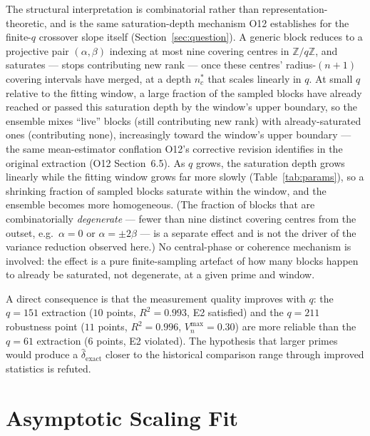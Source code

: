 \documentclass[11pt,a4paper]{article}
\theoremstyle{plain}
\theoremstyle{definition}
\newcommand{\dhat}{\hat\delta_{\mathrm{exact}}}
\begin{document}
  The structural interpretation is combinatorial rather than
  representation-theoretic, and is the same saturation-depth mechanism O12
  establishes for the finite-$q$ crossover slope itself (Section~\ref{sec:question}).
  A generic block reduces to a projective pair $(\alpha,\beta)$ indexing at most
  nine covering centres in $\mathbb{Z}/q\mathbb{Z}$, and saturates — stops
  contributing new rank — once these centres' radius-$(n{+}1)$ covering
  intervals have merged, at a depth $n_c^*$ that scales linearly in $q$.
  At small $q$ relative to the fitting window, a large fraction of the sampled
  blocks have already reached or passed this saturation depth by the window's
  upper boundary, so the ensemble mixes ``live'' blocks (still contributing new
  rank) with already-saturated ones (contributing none), increasingly toward
  the window's upper boundary — the same mean-estimator conflation O12's
  corrective revision identifies in the original extraction (O12
  Section~6.5).
  As $q$ grows, the saturation depth grows linearly while the fitting window
  grows far more slowly (Table~\ref{tab:params}), so a shrinking fraction of
  sampled blocks saturate within the window, and the ensemble becomes more
  homogeneous.
  (The fraction of blocks that are combinatorially \emph{degenerate} — fewer
  than nine distinct covering centres from the outset, e.g.\ $\alpha=0$ or
  $\alpha=\pm2\beta$ — is a separate effect and is not the driver of the
  variance reduction observed here.)
  No central-phase or coherence mechanism is involved: the effect is a pure
  finite-sampling artefact of how many blocks happen to already be saturated,
  not degenerate, at a given prime and window.

  A direct consequence is that the measurement quality improves with $q$:
  the $q = 151$ extraction ($10$ points, $R^2 = 0.993$, E2 satisfied) and the
  $q = 211$ robustness point ($11$ points, $R^2 = 0.996$, $V_n^{\max} = 0.30$)
  are more reliable than the $q = 61$ extraction ($6$ points, E2 violated).
  The hypothesis that larger primes would produce a $\dhat$ closer to the historical
  comparison range through improved statistics is refuted.

  \section{Asymptotic Scaling Fit}
  \label{sec:scaling}
\end{document}
